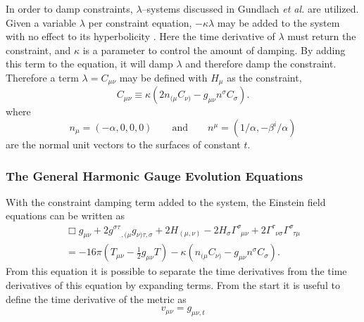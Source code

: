 \documentclass[11pt]{article}
\newcommand{\blank}{\enspace}
\newcommand{\blankt}{\text{ }}
\numberwithin{equation}{section}
\begin{document}
In order to damp constraints, $\lambda$--systems discussed in Gundlach {\it et al.} \cite{gundlach} are utilized. Given a variable $\lambda$ per constraint equation, $-\kappa \lambda$ may be added to the system with no effect to its hyperbolicity \cite{gundlach}. Here the time derivative of $\lambda$ must return the constraint, and $\kappa$ is a parameter to control the amount of damping. By adding this term to the equation, it will damp $\lambda$ and therefore damp the constraint. Therefore a term $\lambda = C_{\mu\nu}$ may be defined with $H_{\mu}$ as the constraint, 
\begin{equation}\label{constraintdampterm}
    C_{\mu\nu} \equiv \kappa (2 n_{(\mu}C_{\nu)} - g_{\mu\nu}n^{\sigma}C_{\sigma}).
\end{equation}
where 
\begin{equation}
    n_{\mu} = (-\alpha, 0, 0, 0) \qquad \text{and} \qquad n^{\mu} = (1/\alpha, -\beta^i/\alpha)
\end{equation}
are the normal unit vectors to the surfaces of constant $t$. 

\subsubsection{The General Harmonic Gauge Evolution Equations}
With the constraint damping term added to the system, the Einstein field equations can be written as
\begin{equation}
\begin{split}\label{fullghgeq}
    \Box g_{\mu\nu} + 2g^{\sigma\tau}_{\blank\blankt,(\mu}g^{\phantom{\sigma\tau}}_{\nu)\tau,\sigma} + 2H_{(\mu,\nu)}
    - 2H_{\sigma}\Gamma^{\sigma}_{\blank\mu\nu} + 2\Gamma^{\tau}_{\blank\nu\sigma}\Gamma^{\sigma}_{\blank\tau\mu} \\
    = -16\pi(T_{\mu\nu} - \frac12g_{\mu\nu}T) - \kappa ( n_{(\mu}C_{\nu)} - g_{\mu\nu}n^{\sigma}C_{\sigma}).
\end{split}
\end{equation}
From this equation it is possible to separate the time derivatives from the time derivatives of this equation by expanding terms.
From the start it is useful to define the time derivative of the metric as
\begin{equation}
    v_{\mu\nu} = g_{\mu\nu,t} 
\end{equation}
\end{document}
